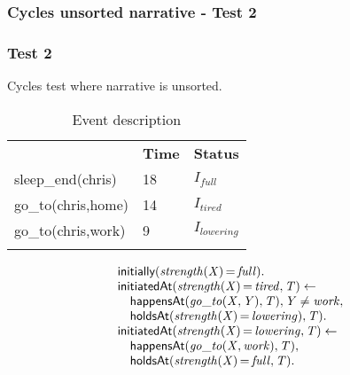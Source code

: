 \documentclass[8pt]{beamer}
\DeclareMathOperator{\val}{=}  %
\def \patsize {}
\def\happensAt{\textsf{\patsize happensAt}}
\def\initially{\textsf{\patsize initially}}
\def\holdsAt{\textsf{\patsize holdsAt}}
\def\initiatedAt{\textsf{\patsize initiatedAt}}
\newenvironment{mysplit}%
  {\arraycolsep 0pt \begin{array}{l}}%
  {\end{array}}
\begin{document}
\begin{frame}
    \frametitle{Cycles unsorted narrative - Test 2}
    \subsubsection{Test 2}
    \small
    Cycles test where narrative is unsorted.\linebreak
    \begin{minipage}{0.4\linewidth}
        \begin{table}[t!]
            \caption{Event description}
            \begin{center}

                \begin{tabular}{lll}
                    \hline\noalign{\smallskip}
                    \multicolumn{1}{l}{\textbf{Event}} & \multicolumn{1}{c}{\textbf{Time}} & \multicolumn{1}{c}{\textbf{Status}} \\
                    sleep\_end(chris)& 18 & $I_{full}$\\
                    \hline 
                    go\_to(chris,home)& 14 & $I_{tired}$\\
                    go\_to(chris,work)& 9 & $I_{lowering}$\\
                    \noalign{\smallskip}
                    \hline
                \end{tabular}
            \end{center}
        \end{table}
    \end{minipage}
    \begin{minipage}{0.55\linewidth}
        \begin{align*}
            \begin{mysplit}
                \initially\mathit{(strength(X)\val full)}.\\
                \initiatedAt\mathit{(strength(X)\val tired,T)\leftarrow}\\
                \quad    \happensAt\mathit{(go\_to(X,Y),T),Y\neq work,}\\
                \quad    \holdsAt\mathit{(strength(X)\val lowering),T).}\\
                \initiatedAt\mathit{(strength(X)\val lowering,T)\leftarrow}\\
                \quad    \happensAt\mathit{(go\_to(X,work),T),}\\
                \quad    \holdsAt\mathit{(strength(X)\val full,T).}\\

\end{mysplit}
\end{align*}
\end{minipage}
\end{frame}
\end{document}
